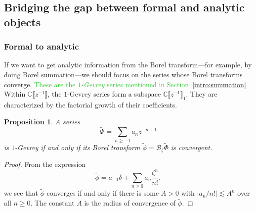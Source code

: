 \documentclass{article}
\newcommand{\C}{\mathbb{C}}
\newcommand{\series}[1]{\tilde{#1}}
\newcommand{\borel}{\mathcal{B}}
\theoremstyle{definition}
\theoremstyle{plain}
\newtheorem{prop}[definition]{Proposition}
\newenvironment{old}{\color{RoyalBlue}}{\color{black}}
\begin{document}
\subsection{Bridging the gap between formal and analytic objects}\label{sec:bridging}
%
%
\subsubsection{Formal to analytic}\label{sec:Borel-gevrey}
%
If we want to get analytic information from the Borel transform---for example, by doing Borel summation---we should focus on the series whose Borel transforms converge. \begin{old}\textcolor{LimeGreen}{These are the {\em $1$-Gevrey} series mentioned in Section~\ref{intro:summation}.}\end{old} Within $\C \llbracket z^{-1} \rrbracket$, the $1$-Gevrey series form a subspace $\C \llbracket z^{-1} \rrbracket_1$. They are characterized by the factorial growth of their coefficients.
\begin{prop}\label{prop:gevrey_to_convergent}
A series
\[ \series{\Phi} = \sum_{n \ge -1} a_n z^{-n-1} \]
is $1$-Gevrey if and only if its Borel transform $\series{\phi} = \borel_\zeta \series{\Phi}$ is convergent.
\end{prop}
\begin{proof}
From the expression
\[ \series{\phi} = a_{-1} \delta + \sum_{n \ge 0} a_n \frac{\zeta^n}{n!}, \]
we see that $\series{\phi}$ converges if and only if there is some $A > 0$ with $|a_n / n!| \lesssim A^n$ over all $n \ge 0$. The constant $A$ is the radius of convergence of $\series{\phi}$.
\end{proof}
\end{document}

